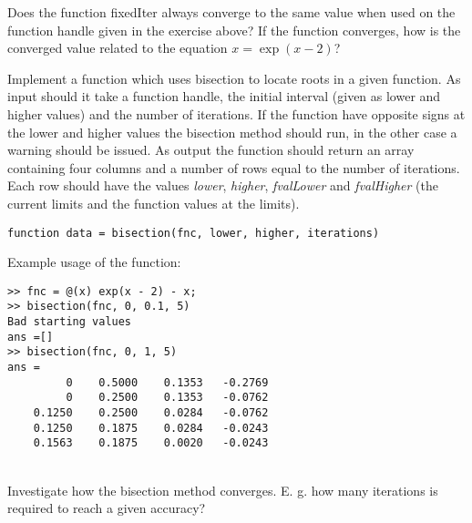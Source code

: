 \begin{ex}
Does the function fixedIter always converge to the same value when used on the function
handle given in the exercise above?
If the function converges, how is the converged value related 
to the equation $x = \exp(x - 2)$?
\end{ex}




\begin{ex}
Implement a function which uses bisection to locate roots in a given function. 
As input should it take a function handle, the initial interval (given as 
lower and higher values) and the number of iterations.
If the function have opposite signs at the lower and higher values the 
bisection method should run, in the other case a warning should be issued.
As output the function should return an array containing four columns and a number of 
rows equal to the number of iterations.
Each row should have the values \emph{lower}, \emph{higher}, \emph{fvalLower} and 
\emph{fvalHigher} (the current limits and the function values at the limits).
 
\begin{lstlisting}
function data = bisection(fnc, lower, higher, iterations)
\end{lstlisting}
Example usage of the function:
\begin{lstlisting}
>> fnc = @(x) exp(x - 2) - x;
>> bisection(fnc, 0, 0.1, 5)
Bad starting values
ans =[]
>> bisection(fnc, 0, 1, 5)
ans =
         0    0.5000    0.1353   -0.2769
         0    0.2500    0.1353   -0.0762
    0.1250    0.2500    0.0284   -0.0762
    0.1250    0.1875    0.0284   -0.0243
    0.1563    0.1875    0.0020   -0.0243
\end{lstlisting}
\end{ex}


\begin{ex}\\
Investigate how the bisection method converges. 
E. g. how many iterations is required to reach a given accuracy?
\end{ex}

